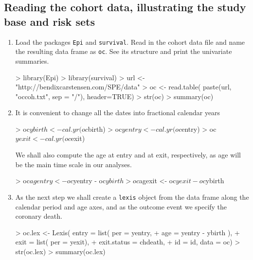    
  
\subsection{Reading the cohort data, illustrating the study base and risk sets}

\begin{enumerate}[resume]

\item
Load the packages {\tt Epi} and {\tt survival}. 
Read in the cohort data file and name
the resulting data frame as \texttt{oc}.
See its structure and print the univariate summaries.
\begin{Schunk}
\begin{Sinput}
> library(Epi)
> library(survival)
> url <- "http://bendixcarstensen.com/SPE/data"
> oc <- read.table( paste(url, "occoh.txt", sep = "/"), header=TRUE)
> str(oc)
> summary(oc)
\end{Sinput}
\end{Schunk}

\item
It is convenient to change all the dates into fractional calendar years
\begin{Schunk}
\begin{Sinput}
> oc$ybirth <- cal.yr(oc$birth) 
> oc$yentry <- cal.yr(oc$entry) 
> oc$yexit <- cal.yr(oc$exit)
\end{Sinput}
\end{Schunk}

We shall also compute the age at entry and at exit, respectively,
as age will be the main time scale in our analyses.
\begin{Schunk}
\begin{Sinput}
> oc$agentry <- oc$yentry - oc$ybirth
> oc$agexit <- oc$yexit - oc$ybirth 
\end{Sinput}
\end{Schunk}
\item
As the next step we shall create a {\tt lexis} object
from the data frame along the calendar period and age axes,
and as the outcome event we specify the coronary death.
\begin{Schunk}
\begin{Sinput}
> oc.lex <- Lexis( entry = list( per = yentry, 
+                                age = yentry - ybirth ), 
+                   exit = list( per = yexit),
+            exit.status = chdeath,
+                     id = id, data = oc)
> str(oc.lex)
> summary(oc.lex)
\end{Sinput}
\end{Schunk}


\end{enumerate}
